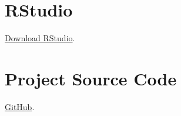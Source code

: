 \documentclass[
]{book}
\begin{document}
\hypertarget{rstudio}{%
\section*{RStudio}\label{rstudio}}

\href{https://rstudio.com/products/rstudio/download/\#download}{Download RStudio}.

\hypertarget{project-source-code}{%
\section*{Project Source Code}\label{project-source-code}}

\href{https://github.com/Peter-Kedron/COVID-19-Digital-Contact-Tracing-and-Geospatial-Technologies-and-Privacy}{GitHub}.

  
\end{document}
